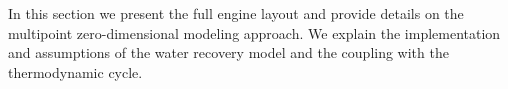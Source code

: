 \documentclass[conf]{new-aiaa}
\begin{document}
In this section we present the full engine layout and provide details on the multipoint zero-dimensional modeling approach.
We explain the implementation and assumptions of the water recovery model and the coupling with the thermodynamic cycle.
\end{document}
